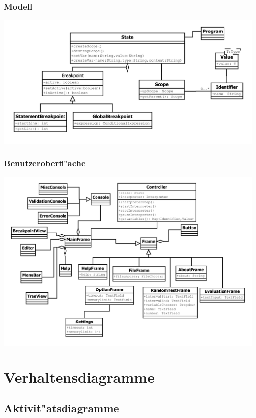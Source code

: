 \documentclass[10pt,a4paper,titlepage]{article}
\begin{document}
\subsubsection{Modell}
\includegraphics[scale=0.8]{images/Modell.pdf}
\subsubsection{Benutzeroberfl"ache}
\includegraphics[scale=0.85]{images/Gui.pdf}

\section{Verhaltensdiagramme}
\subsection{Aktivit"atsdiagramme}
\end{document}
